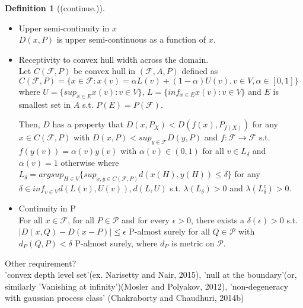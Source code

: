 \documentclass[aspectratio=169,ignorenonframetext,9pt]{beamer}
\theoremstyle{plain}
\theoremstyle{definition}
\newtheorem{defn}{Definition}[section]
\begin{document}
\begin{frame}
    \begin{defn}[(continue.)]
        \begin{itemize}
        \item Upper semi-continuity in $x$ \\
            $D(x,P)$ is upper semi-continuous as a function of $x$.
        \item Receptivity to convex hull width across the domain. \\
            Let $C(\mathcal{F},P)$ be convex hull in $(\mathcal{F},A,P)$ defined as
            \(C(\mathcal{F},P)=\{x\in\mathcal{F} : x(v)=\alpha L(v)+ (1-\alpha)U(v), v\in V, \alpha\in[0,1]\}\)
            where $U=\{sup_{x\in E}x(v):v\in V\}$, $L=\{inf_{x\in E}x(v):v\in V\}$
            and $E$ is smallest set in $A$ s.t. $P(E)=P(\mathcal{F})$.

            Then, $D$ has a property that $D(x,P_X)<D(f(x),P_{f(X)})$ for any $x\in C(\mathcal{F},P)$
            with $D(x,P)<sup_{y\in\mathcal{F}}D(y,P)$ and $f:\mathcal{F}\rightarrow\mathcal{F}$
            s.t. $f(y(v))=\alpha(v)y(v)$ with $\alpha(v)\in(0,1)$ for all $v\in L_{\delta}$ and $\alpha(v)=1$  otherwise
            where \(L_\delta = argsup_{H\in V} \{sup_{x,y\in C(\mathcal{F},P)} d(x(H),y(H)) \leq \delta\}\)
            for any $\delta\in inf_{v\in V}d(L(v),U(v)), d(L,U)$ s.t. $\lambda(L_\delta)>0$ and $\lambda(L_\delta^c)>0$.
        \item Continuity in P \\ 
            For all $x\in\mathcal{F}$, for all $P \in \mathcal{P}$ and for every $\epsilon>0$,
            there exists a $\delta(\epsilon)>0$ s.t. $|D(x,Q)-D(x-P)|\leq\epsilon$ P-almost surely for all $Q\in\mathcal{P}$ with
            $d_P(Q,P)<\delta$ P-almost surely, where $d_P$ is metric on $\mathcal{P}$.
        \end{itemize}
    \end{defn}
Other requirement? \\
'convex depth level set'(ex. Narisetty and Nair, 2015),
'null at the boundary'(or, similarly 'Vanishing at infinity')(Mosler and Polyakov, 2012),
'non-degeneracy with gaussian process class' (Chakraborty and Chaudhuri, 2014b)

\end{frame}
\end{document}
